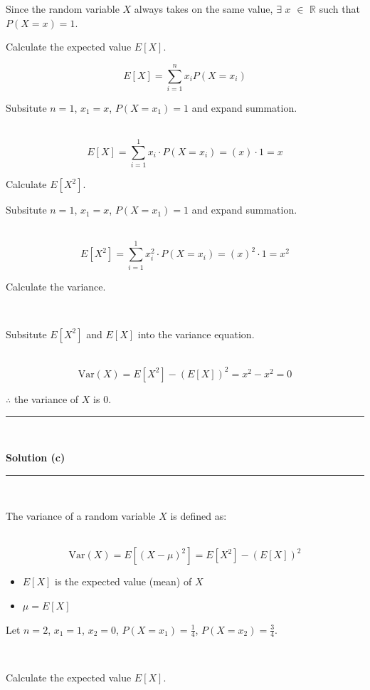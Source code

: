 \documentclass{article}
\begin{document}
\parbox{\textwidth}{Since the random variable $X$ always takes on the same value, $\exists$ $x$ $\in$ $\mathbb{R}$ such that $P(X=x) =1$.}

\parbox{\textwidth}{Calculate the expected value $E[X]$.}

$$E[X] = \sum^{n}_{i=1} x_i P(X = x_i)$$

\parbox{\textwidth}{Subsitute $n=1$, $x_1=x$, $P(X = x_1) =1$ and expand summation.}\\

$$E[X] = \sum^1_{i=1} x_i \cdot P(X = x_i) = (x) \cdot 1 = x$$

\parbox{\textwidth}{Calculate $E[X^2]$.}

\parbox{\textwidth}{Subsitute $n=1$, $x_1=x$, $P(X = x_1) =1$ and expand summation.}\\

$$E[X^2] = \sum^1_{i=1} x_i^2 \cdot P(X = x_i) = (x)^2 \cdot 1 = x^2$$

\parbox{\textwidth}{Calculate the variance.}\\

\parbox{\textwidth}{Subsitute $E[X^2]$ and $E[X]$ into the variance equation.}\\

$$\text{Var}(X) = E[X^2] - (E[X])^2 = x^2 - x^2 = 0$$

\parbox{\textwidth}{$\therefore$ the variance of $X$ is 0.}

\noindent\rule{\textwidth}{0.4pt}\\

\newpage

\textbf{Solution (c)}

\noindent\rule{\textwidth}{0.4pt}\\

\parbox{\textwidth}{The variance of a random variable $X$ is defined as:}\\

$$\text{Var}(X) = E[(X - \mu)^2] = E[X^2] - (E[X])^2$$

\begin{itemize}
    \item $E[X]$ is the expected value (mean) of $X$
    \item $\mu = E[X]$
\end{itemize}

\parbox{\textwidth}{Let $n = 2$, $x_1 = 1$, $x_2 = 0$, $P(X = x_1) = \frac{1}{4}$, $P(X = x_2) = \frac{3}{4}$.}\\

\parbox{\textwidth}{Calculate the expected value $E[X]$.}\\
\end{document}
